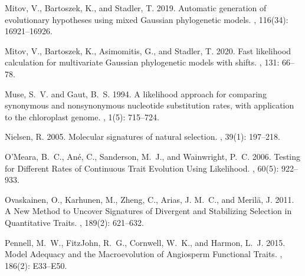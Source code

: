 \documentclass{article}
\begin{document}
\begin{thebibliography}{}
    Mitov, V., Bartoszek, K., and Stadler, T. 2019.
    \newblock Automatic generation of evolutionary hypotheses using mixed
        {{Gaussian}} phylogenetic models.
    , {116}(34):
    16921--16926.

    Mitov, V., Bartoszek, K., Asimomitis, G., and Stadler, T. 2020.
    \newblock Fast likelihood calculation for multivariate {{Gaussian}}
    phylogenetic models with shifts.
    , {131}: 66--78.

    Muse, S.~V. and Gaut, B.~S. 1994.
    \newblock A likelihood approach for comparing synonymous and nonsynonymous
    nucleotide substitution rates, with application to the chloroplast genome.
    , {1}(5): 715--724.

    Nielsen, R. 2005.
    \newblock Molecular signatures of natural selection.
    , {39}(1): 197--218.

    O'Meara, B.~C., An{\'e}, C., Sanderson, M.~J., and Wainwright, P.~C. 2006.
    \newblock Testing for {{Different Rates}} of {{Continuous Trait Evolution Using
    Likelihood}}.
    , {60}(5): 922--933.

    Ovaskainen, O., Karhunen, M., Zheng, C., Arias, J. M.~C., and Meril{\"a}, J.
    2011.
    \newblock A {{New Method}} to {{Uncover Signatures}} of {{Divergent}} and
        {{Stabilizing Selection}} in {{Quantitative Traits}}.
    , {189}(2): 621--632.

    Pennell, M.~W., FitzJohn, R.~G., Cornwell, W.~K., and Harmon, L.~J. 2015.
    \newblock Model {{Adequacy}} and the {{Macroevolution}} of {{Angiosperm
    Functional Traits}}.
    , {186}(2): E33--E50.


\end{thebibliography}
\end{document}
